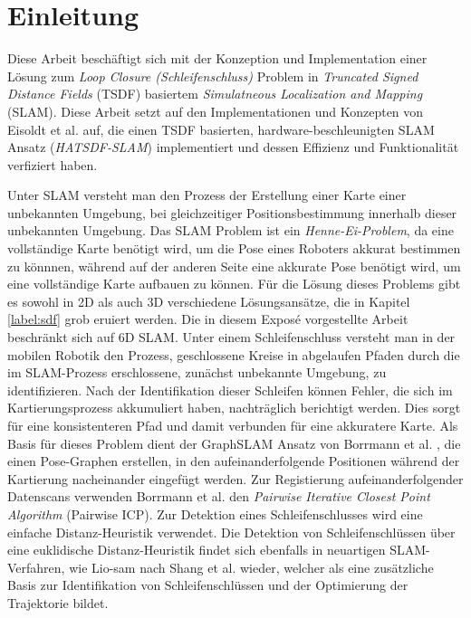 \chapter{Einleitung}

Diese Arbeit beschäftigt sich mit der Konzeption und Implementation einer Lösung zum \textit{Loop Closure  (Schleifenschluss)} Problem in \textit{Truncated Signed Distance Fields} (TSDF) basiertem \textit{Simulatneous Localization and Mapping} (SLAM).
Diese Arbeit setzt auf den Implementationen und Konzepten von Eisoldt et al. \cite{HATSDF} auf, die einen TSDF basierten, hardware-beschleunigten SLAM Ansatz (\textit{HATSDF-SLAM}) implementiert und dessen Effizienz und Funktionalität verfiziert haben.

Unter SLAM versteht man den Prozess der Erstellung einer Karte einer unbekannten Umgebung, bei gleichzeitiger Positionsbestimmung innerhalb dieser unbekannten Umgebung.
Das SLAM Problem ist ein \textit{Henne-Ei-Problem}, da eine vollständige Karte benötigt wird, um die Pose eines Roboters akkurat bestimmen zu könnnen, während auf der anderen Seite eine akkurate Pose benötigt wird, um eine vollständige Karte aufbauen zu können.
Für die Lösung dieses Problems gibt es sowohl in 2D als auch 3D verschiedene Lösungsansätze, die in Kapitel \ref{label:sdf} grob eruiert werden.
Die in diesem Exposé vorgestellte Arbeit beschränkt sich auf 6D SLAM.
Unter einem Schleifenschluss versteht man in der mobilen Robotik den Prozess, geschlossene Kreise in abgelaufen Pfaden durch die im SLAM-Prozess erschlossene, zunächst unbekannte Umgebung, zu identifizieren.
Nach der Identifikation dieser Schleifen können Fehler, die sich im Kartierungsprozess akkumuliert haben, nachträglich berichtigt werden. Dies sorgt für eine konsistenteren Pfad und damit verbunden für eine akkuratere Karte.
Als Basis für dieses Problem dient der GraphSLAM Ansatz von Borrmann et al. \cite{borrmann2008globally}, die einen Pose-Graphen erstellen, in den aufeinanderfolgende Positionen während der Kartierung nacheinander eingefügt werden. Zur Registierung aufeinanderfolgender Datenscans verwenden Borrmann et al. \cite{borrmann2008globally} den \textit{Pairwise Iterative Closest Point Algorithm} (Pairwise ICP). Zur Detektion eines Schleifenschlusses wird eine einfache Distanz-Heuristik verwendet.
Die Detektion von Schleifenschlüssen über eine euklidische Distanz-Heuristik findet sich ebenfalls in neuartigen SLAM-Verfahren, wie Lio-sam nach Shang et al. \cite{shan2020lio} wieder, welcher als eine zusätzliche Basis zur Identifikation von Schleifenschlüssen und der Optimierung der Trajektorie bildet.
